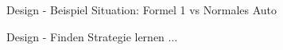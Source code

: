 \begin{frame}[c]{Design - Beispiel}
    \Large
    Situation: Formel 1 vs Normales Auto
\end{frame}


%
%

\begin{frame}[c]{Design - Finden}
    \Large
    Strategie lernen ...
\end{frame}
